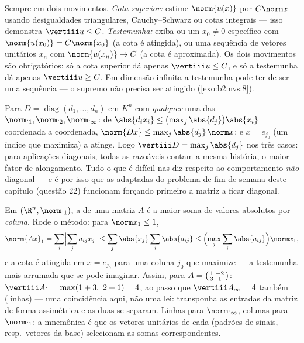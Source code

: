 \begin{method}\label{met:b2:nvs:opnorm}
Sempre em dois movimentos. \emph{Cota superior:} estime
$\norm{u(x)}$ por $C\norm x$ usando desigualdades triangulares,
Cauchy--Schwarz ou cotas integrais --- isso demonstra $\vertiii u
\leq C$. \emph{Testemunha:} exiba ou um $x_0 \neq 0$ específico
com $\norm{u(x_0)} = C\norm{x_0}$ (a cota é atingida), ou uma
sequência de vetores unitários $x_n$ com $\norm{u(x_n)} \to C$ (a
cota é aproximada). Os dois movimentos são obrigatórios: só a cota superior
dá apenas $\vertiii u \leq C$, e só a testemunha dá apenas
$\vertiii u \geq C$. Em dimensão infinita a testemunha pode ter
de ser uma sequência --- o supremo não precisa ser atingido
(\cref{exo:b2:nvs:8}).
\end{method}

\begin{example}\label{ex:b2:nvs:diagonalnorm}
Para $D = \operatorname{diag}(d_1, \dots, d_n)$ em $K^n$ com
\emph{qualquer} uma das  $\norm\cdot_1, \norm\cdot_2,
\norm\cdot_\infty$: de $\abs{d_ix_i} \leq
\bigl(\max_j\abs{d_j}\bigr)\abs{x_i}$ coordenada a coordenada,
$\norm{Dx} \leq \max_j\abs{d_j}\,\norm x$; e $x = e_{j_0}$
(um índice que maximiza) a atinge. Logo $\vertiii D =
\max_j\abs{d_j}$ nos três casos: para aplicações diagonais, todas as
 razoáveis contam a mesma história, o maior fator de
alongamento. Tudo o que é difícil nas  diz respeito ao
comportamento \emph{não} diagonal --- e é por isso que as  adaptadas
do problema de fim de semana deste capítulo (questão 22) funcionam
forçando primeiro a matriz a ficar diagonal.
\end{example}

\begin{example}\label{ex:b2:nvs:columnsums}
Em $(\R^n, \norm\cdot_1)$, a  de uma matriz $A$ é
a maior soma de valores absolutos por \emph{coluna}. Rode o método: para
$\norm x_1 \leq 1$,
\[
\norm{Ax}_1 = \sum_i\Bigl|\sum_j a_{ij}x_j\Bigr|
\leq \sum_j \abs{x_j}\sum_i\abs{a_{ij}}
\leq \Bigl(\max_j\sum_i\abs{a_{ij}}\Bigr)\norm x_1 ,
\]
e a cota é atingida em $x = e_{j_0}$ para uma coluna $j_0$ que
maximize --- a testemunha mais arrumada que se pode imaginar. Assim, para $A =
\begin{psmallmatrix}1 & -2\\ 3 & 1\end{psmallmatrix}$:
$\vertiii A_1 = \max(1 + 3,\ 2 + 1) = 4$, ao passo que
$\vertiii A_\infty = 4$ também (linhas) --- uma coincidência aqui, não
uma lei: transponha as entradas da matriz de forma assimétrica e as duas
 se separam. Linhas para $\norm\cdot_\infty$, colunas para
$\norm\cdot_1$: a mnemônica é que os vetores unitários de cada 
(padrões de sinais, resp.\ vetores da base) selecionam as somas
correspondentes.
\end{example}

